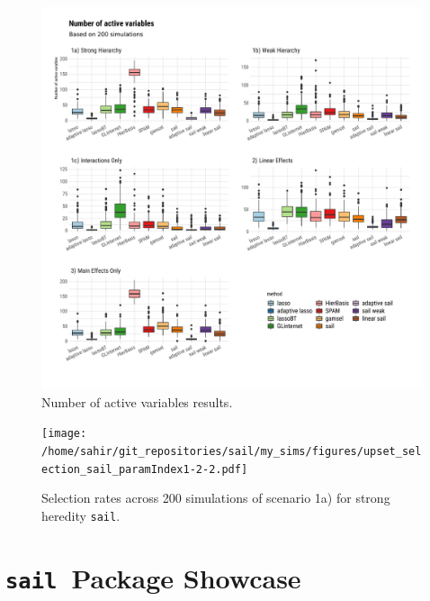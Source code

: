 \documentclass[12pt,letter]{article}\usepackage[]{graphicx}\usepackage[]{color}
\newenvironment{knitrout}{}{} %
\newcommand{\sail}{\texttt{sail}}
\begin{document}
\begin{knitrout}\scriptsize
{}\color{fgcolor}\begin{figure}[H]

{\centering \includegraphics[width=1\linewidth]{figure/plot-nactive-sim-1} 

}

\caption[Number of active variables results]{Number of active variables results.}\label{fig:plot-nactive-sim}
\end{figure}


\end{knitrout}


\begin{figure}[H]
	\centering
	\texttt{[image: /home/sahir/git\_repositories/sail/my\_sims/figures/upset\_selection\_sail\_paramIndex1-2-2.pdf]}
	\caption{Selection rates across 200 simulations of scenario 1a) for strong heredity \sail.}\label{fig:upset}
\end{figure}

\FloatBarrier 

\section{\sail ~Package Showcase} \label{ap:showcase}
\end{document}

